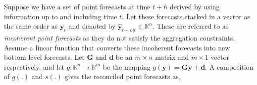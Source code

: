 \documentclass[12pt]{article}
\theoremstyle{definition}
\newtheorem{definition}{Definition}[section]
\begin{document}
%
%






Suppose we have a set of point forecasts at time $t+h$ derived by using information up to and including time $t$. Let these forecasts stacked in a vector as the same order as $\bm{y}_t$ and denoted by $\hat{\bm{y}}_{t+h|t} \in \mathbb{R}^n$. These are referred to as \emph{incoherent point forecasts} as they do not satisfy the aggregation constraints. Assume a linear function that converts these incoherent forecasts into new bottom level forecasts.
Let $\bm{G}$ and $\bm{d}$ be an $m\times n$ matrix and $m\times 1$ vector respectively, and let $g:\mathbb{R}^n \rightarrow \mathbb{R}^m$ be the mapping $g(\bm{y})=\bm{G}\bm{y}+\bm{d}$.  A composition of $g(.)$ and $s(.)$ gives the reconciled point forecasts as, 
\end{document}
